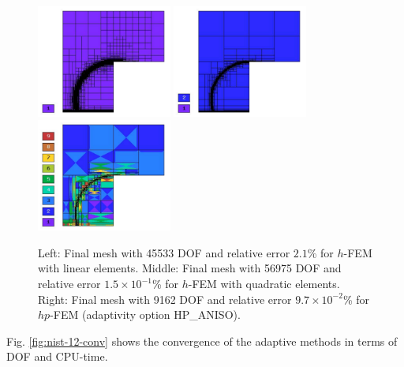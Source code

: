 \documentclass[12pt]{elsarticle}
\begin{document}
\begin{figure}[H]
\centering
\includegraphics[height=3.7cm]{mafig72.pdf}
\includegraphics[height=3.7cm]{mafig73.pdf}
\includegraphics[height=3.7cm]{mafig74.pdf}
\caption{
Left: Final mesh with 45533 DOF and relative error $2.1$\% for $h$-FEM with linear elements.
Middle: Final mesh with 56975 DOF and relative error $1.5\times10^{-1}$\% for $h$-FEM with quadratic elements.
Right: Final mesh with 9162 DOF and relative error $9.7\times10^{-2}$\% for $hp$-FEM (adaptivity option HP\_ANISO).}
\label{fig:nist-12-hp-aniso}
\end{figure}

Fig. \ref{fig:nist-12-conv} shows the convergence of the adaptive methods in terms of DOF and CPU-time.
\end{document}
